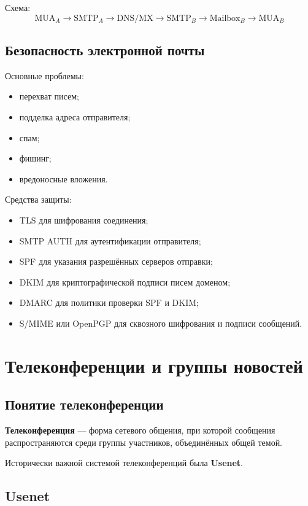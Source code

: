 \documentclass[12pt,a4paper]{article}
\begin{document}
Схема:
\[
\text{MUA}_A \rightarrow \text{SMTP}_A \rightarrow \text{DNS/MX} \rightarrow \text{SMTP}_B \rightarrow \text{Mailbox}_B \rightarrow \text{MUA}_B
\]

\subsection{Безопасность электронной почты}

Основные проблемы:
\begin{itemize}
    \item перехват писем;
    \item подделка адреса отправителя;
    \item спам;
    \item фишинг;
    \item вредоносные вложения.
\end{itemize}

Средства защиты:
\begin{itemize}
    \item TLS для шифрования соединения;
    \item SMTP AUTH для аутентификации отправителя;
    \item SPF для указания разрешённых серверов отправки;
    \item DKIM для криптографической подписи писем доменом;
    \item DMARC для политики проверки SPF и DKIM;
    \item S/MIME или OpenPGP для сквозного шифрования и подписи сообщений.
\end{itemize}

\section{Телеконференции и группы новостей}

\subsection{Понятие телеконференции}

\textbf{Телеконференция} --- форма сетевого общения, при которой сообщения распространяются среди группы участников, объединённых общей темой.

Исторически важной системой телеконференций была \textbf{Usenet}.

\subsection{Usenet}
\end{document}
